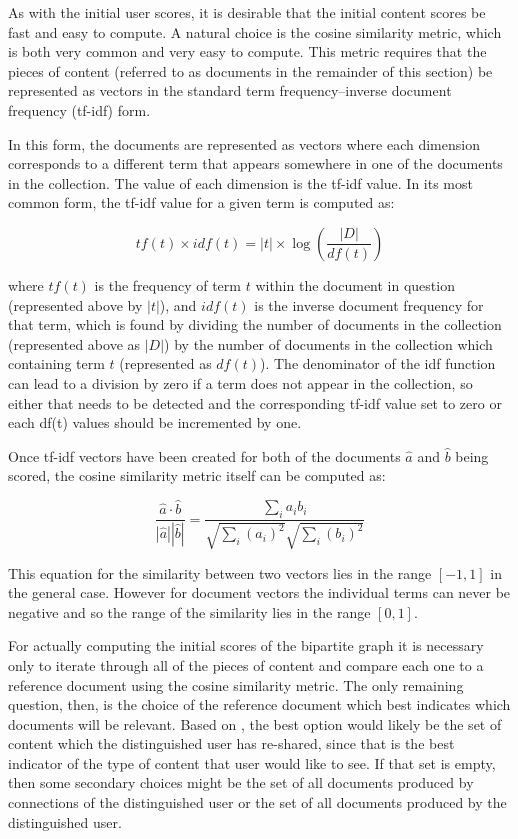 As with the initial user scores, it is desirable that the initial content scores be fast and easy to compute. A natural choice is the cosine similarity metric, which is both very common and very easy to compute. This metric requires that the pieces of content (referred to as documents in the remainder of this section) be represented as vectors in the standard term frequency--inverse document frequency (tf-idf) form.

In this form, the documents are represented as vectors where each dimension corresponds to a different term that appears somewhere in one of the documents in the collection. The value of each dimension is the tf-idf value. In its most common form, the tf-idf value for a given term is computed as:

\begin{center}
\[
tf(t) \times idf(t) = |t| \times \log(\frac{|D|}{df(t)})
\]
\end{center}
\noindent
where $tf(t)$ is the frequency of term $t$ within the document in question (represented above by $|t|$), and $idf(t)$ is the inverse document frequency for that term, which is found by dividing the number of documents in the collection (represented above as $|D|$) by the number of documents in the collection which containing term $t$ (represented as $df(t)$). The denominator of the idf function can lead to a division by zero if a term does not appear in the collection, so either that needs to be detected and the corresponding tf-idf value set to zero or each df(t) values should be incremented by one.

Once tf-idf vectors have been created for both of the documents $\hat{a}$ and $\hat{b}$ being scored, the cosine similarity metric itself can be computed as:

\begin{center}
\[
\frac{\hat{a} \cdot \hat{b}}
        {|\hat{a}| |\hat{b}|} 
=
\frac{ \sum\nolimits_{i} a_{i} b_{i} }
       { \sqrt{\sum\nolimits_{i} (a_{i})^{2} } \sqrt{\sum\nolimits_{i} (b_{i})^{2}} }
\]
\end{center}

This equation for the similarity between two vectors lies in the range $[-1,1]$ in the general case. However for document vectors the individual terms can never be negative and so the range of the similarity lies in the range $[0,1]$.

For actually computing the initial scores of the bipartite graph it is necessary only to iterate through all of the pieces of content and compare each one to a reference document using the cosine similarity metric. The only remaining question, then, is the choice of the reference document which best indicates which documents will be relevant. Based on \cite{Welch2011}, the best option would likely be the set of content which the distinguished user has re-shared, since that is the best indicator of the type of content that user would like to see. If that set is empty, then some secondary choices might be the set of all documents produced by connections of the distinguished user or the set of all documents produced by the distinguished user.

